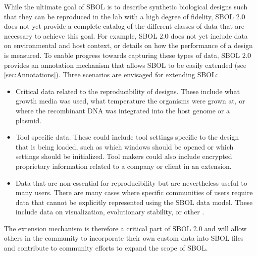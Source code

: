 While the ultimate goal of SBOL is to describe synthetic biological designs such that they can be reproduced in the lab with a high degree of fidelity, SBOL 2.0 does not yet provide a complete catalog of the different classes of data that are necessary to achieve this goal. For example, SBOL 2.0 does not yet include data on environmental and host context, or details on how the performance of a design is measured. To enable progress towards capturing these types of data, SBOL 2.0 provides an annotation mechanism that allows SBOL to be easily extended (see \ref{sec:Annotations}). Three scenarios are envisaged for extending SBOL:

\begin{itemize}
\item Critical data related to the reproducibility of designs. These include  what growth media was used, what temperature the organisms were grown at, or where the recombinant DNA was integrated into the host genome or a plasmid.
\item Tool specific data. These could include tool settings specific to the design that is being loaded, such as which windows should be opened or which settings should be initialized. Tool makers could also include encrypted proprietary information related to a company or client in an extension. 
\item Data that are non-essential for  reproducibility but are nevertheless useful to many users. There are many cases where specific communities of users require data that cannot be explicitly represented using the SBOL data model. These include data on visualization, evolutionary stability, or other .
\end{itemize}

The extension mechanism is therefore a critical part of SBOL 2.0 and will allow others in the community to incorporate their own custom data into SBOL files and contribute to community efforts to expand the scope of SBOL.



